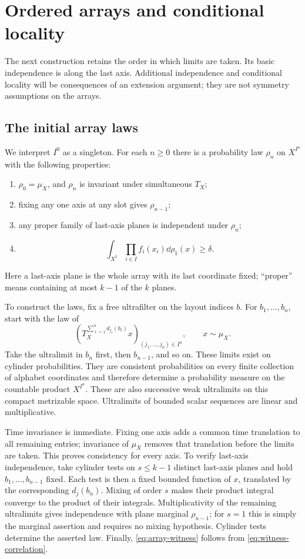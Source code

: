 \section{Ordered arrays and conditional locality}\label{sec:arrays}

The next construction retains the order in which limits are taken.  Its
basic independence is along the last axis.  Additional independence and
conditional locality will be consequences of an extension argument; they
are not symmetry assumptions on the arrays.

\subsection{The initial array laws}

We interpret $I^0$ as a singleton.  For each $n\geq0$ there is a
probability law $\rho_n$ on $X^{I^n}$ with the following properties:
\begin{enumerate}
\item $\rho_0=\mu_X$, and $\rho_n$ is invariant under simultaneous $T_X$;
\item fixing any one axis at any slot gives $\rho_{n-1}$;
\item any proper family of last-axis planes is independent under
      $\rho_n$;
\item
\begin{equation}\label{eq:array-witness}
 \int_{X^I}\prod_{i\in I}f_i(x_i)\dd\rho_1(x)\geq\delta.
\end{equation}
\end{enumerate}
Here a last-axis plane is the whole array with its last coordinate fixed;
``proper'' means containing at most $k-1$ of the $k$ planes.

To construct the laws, fix a free ultrafilter on the layout indices $b$.
For $b_1,\ldots,b_n$, start with the law of
\[
 \left(T_X^{\sum_{\ell=1}^n d_{j_\ell}(b_\ell)}x
       \right)_{(j_1,\ldots,j_n)\in I^n},\qquad x\sim\mu_X.
\]
Take the ultralimit in $b_n$ first, then $b_{n-1}$, and so on.  These
limits exist on cylinder probabilities.  They are consistent
probabilities on every finite collection of alphabet coordinates and
therefore determine a probability measure on the countable product
$X^{I^n}$.  These are also successive weak ultralimits on this compact
metrizable space.  Ultralimits of bounded scalar sequences are
linear and multiplicative.

Time invariance is immediate.  Fixing one axis adds a common time
translation to all remaining entries; invariance of $\mu_X$ removes that
translation before the limits are taken.  This proves consistency for
every axis.  To verify last-axis independence, take cylinder tests on
$s\leq k-1$ distinct last-axis planes and hold $b_1,\ldots,b_{n-1}$
fixed.  Each test is then a fixed bounded function of $x$, translated by
the corresponding $d_j(b_n)$.  Mixing of order $s$ makes their product
integral converge to the product of their integrals.  Multiplicativity
of the remaining ultralimits gives independence with plane marginal
$\rho_{n-1}$; for $s=1$ this is simply the marginal assertion and
requires no mixing hypothesis. Cylinder tests determine the asserted law. Finally,
\eqref{eq:array-witness} follows from \eqref{eq:witness-correlation}.

